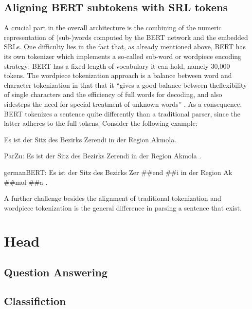 \subsection{Aligning BERT subtokens with SRL tokens}

A crucial part in the overall architecture is the combining of the numeric representation
of (sub-)words computed by the BERT network and the embedded SRLs. One difficulty lies in
the fact that, as already mentioned above, BERT has its own tokenizer which implements
a so-called sub-word or wordpiece \cite{wu2016google} encoding strategy: BERT has a
fixed length of vocabulary it can hold, namely 30,000 tokens. The wordpiece tokenization
approach is a balance between word and character tokenization in that that it ``gives
a good balance between theflexibility of single characters and the efficiency of full
words for decoding, and also sidesteps the need for special treatment of unknown words''
\citep[p.~2]{wu2016google}. As a consequence, BERT tokenizes a sentence quite differently
than a traditional parser, since the latter adheres to the full tokens. Consider the
following example:

\begin{examples}
	\label{ex:tokenization-diff}
	\item Es ist der Sitz des Bezirks Zerendi in der Region Akmola.
	\item ParZu: Es ist der Sitz des Bezirks Zerendi in der Region Akmola .
	\item germanBERT: Es ist der Sitz des Bezirks Zer \#\#end \#\#i in der Region Ak \#\#mol \#\#a .
\end{examples}


A further challenge besides the alignment of traditional tokenization and wordpiece tokenization is
the general difference in parsing a sentence that exist.

\section{Head}

\subsection{Question Answering}

\subsection{Classifiction}

